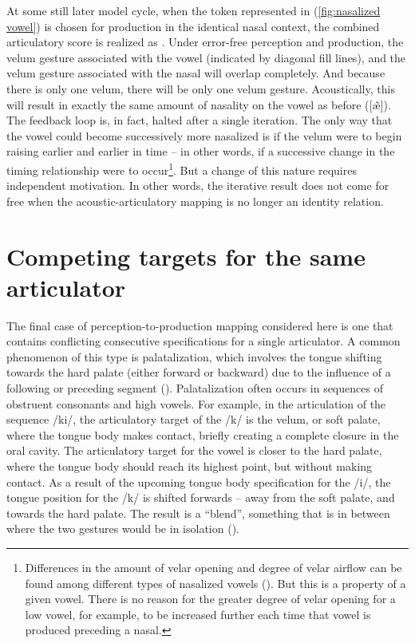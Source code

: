 At some still later model cycle, when the token represented in (\ref{fig:nasalized vowel})
is chosen for production in the identical nasal context, the combined
articulatory score is realized as .
Under error-free perception and production, the velum gesture associated
with the vowel (indicated by diagonal fill lines), and the velum gesture
associated with the nasal will overlap completely. And because there
is only one velum, there will be only one velum gesture. Acoustically,
this will result in exactly the same amount of nasality on the vowel
as before ({[æ̃]}). The feedback loop is, in fact, halted
after a single iteration. The only way that the vowel could become
successively more nasalized is if the velum were to begin raising
earlier and earlier in time – in other words, if a successive change
in the timing relationship were to occur\footnote{Differences in the amount of velar opening and degree of velar airflow
can be found among different types of nasalized vowels (\citealt{bell1993understanding,hajek2000vowel}).
But this is a property of a given vowel. There is no reason for the
greater degree of velar opening for a low vowel, for example, to be
increased further each time that vowel is produced preceding a nasal.}. But a change of this nature requires independent motivation. In
other words, the iterative result does not come for free when the
acoustic-articulatory mapping is no longer an identity relation. 

\section{\label{sec:Competing-targets}Competing targets for the same articulator}

The final case of perception-to-production mapping considered here
is one that contains conflicting consecutive specifications for a
single articulator. A common phenomenon of this type is palatalization,
which involves the tongue shifting towards the hard palate (either
forward or backward) due to the influence of a following or preceding
segment (\citealt{Guion1998,Keating1993}). Palatalization often occurs
in sequences of obstruent consonants and high vowels. For example,
in the articulation of the sequence {/ki/}, the articulatory
target of the {/k/} is the velum, or soft palate, where the
tongue body makes contact, briefly creating a complete closure in
the oral cavity. The articulatory target for the vowel is closer to
the hard palate, where the tongue body should reach its highest point,
but without making contact. As a result of the upcoming tongue body
specification for the {/i/}, the tongue position for the
{/k/} is shifted forwards – away from the soft palate, and
towards the hard palate. The result is a “blend”, something
that is in between where the two gestures would be in isolation (\citealt{Browman1986,Zsiga2000}). 

